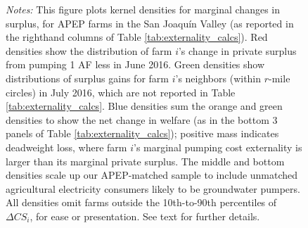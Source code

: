 \begin{figure}[h!]
\caption*{\footnotesize \emph{Notes:} This figure plots kernel densities for marginal changes in surplus, for APEP farms in the San Joaqu\'{i}n Valley (as reported in the righthand columns of Table \ref{tab:externality_calcs}). Red densities show the distribution of farm $i$'s change in private surplus from pumping 1 AF less in June 2016. Green densities show distributions of surplus gains for farm $i$'s neighbors (within $r$-mile circles) in July 2016, which are not reported in Table \ref{tab:externality_calcs}. Blue densities sum the orange and green densities to show the net change in welfare (as in the bottom 3 panels of Table \ref{tab:externality_calcs}); positive mass indicates deadweight loss, where farm $i$'s marginal pumping cost externality is larger than its marginal private surplus.  The middle and bottom densities scale up our APEP-matched sample to include unmatched agricultural electricity consumers likely to be groundwater pumpers. All densities omit farms outside the 10th-to-90th percentiles of $\Delta CS_i$, for ease or presentation. See text for further details.
}
\end{figure}